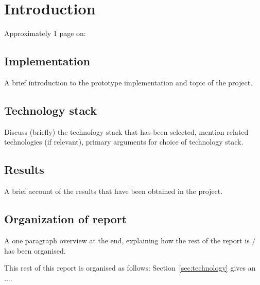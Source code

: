 \section{Introduction}
\label{sec:introduction}

Approximately 1 page on:

\subsection{Implementation}
\label{sub:implementation} A brief introduction to the prototype implementation and topic of the project.

\subsection{Technology stack}
\label{sub:techstack} Discuss (briefly) the technology stack that has been selected, mention related technologies (if relevant), primary arguments for choice of technology stack.

\subsection{Results}
\label{sub:results} A brief account of the results that have been obtained in the project.

\subsection{Organization of report}
\label{sub:organization}A one paragraph overview at the end, explaining how the rest of the report is / has been organised.

\noindent
This rest of this report is organised as follows:
Section~\ref{sec:technology} gives an ....
